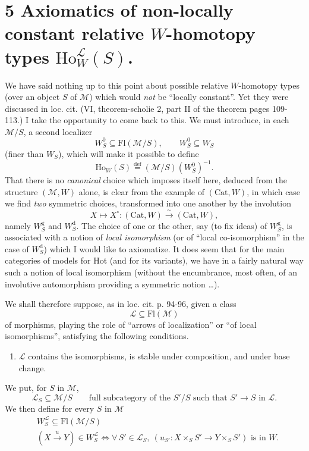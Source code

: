 \documentclass[11pt]{article}
\newcommand{\printedpage}[1]{\marginpar{\footnotesize p.~#1}}
\newcommand{\msp}[1]{\marginpar{\footnotesize [#1]}}
\newcommand{\deff}{\overset{\text{def}}{=}}
\begin{document}
\printedpage{140}

\section*{5 Axiomatics of non-locally constant relative $W$-homotopy types $\mathrm{Ho}^{\mathcal{L}}_W(S)$.}

We have said nothing up to this point about possible relative $W$-homotopy types (over an object $S$ of $\mathcal{M}$) which would \textit{not} be ``locally constant''. Yet they were discussed in loc. cit. (VI, theorem-scholie 2, part II of the theorem pages 109-113.) I take the opportunity to come back to this. We must introduce, in each $\mathcal{M}/S$, a second localizer
\[
W^0_S \subseteq \mathrm{Fl}(\mathcal{M}/S), \qquad W^0_S \subseteq W_S
\]
(finer than $W_S$), which will make it possible to define
\msp{page 219}
\[
\mathrm{Ho}_W(S) \deff (\mathcal{M}/S)(W^0_S)^{-1}.
\]
That there is no \textit{canonical} choice which imposes itself here, deduced from the structure $(\mathcal{M},W)$ alone, is clear from the example of $(\mathrm{Cat},W)$, in which case we find \textit{two} symmetric choices, transformed into one another by the involution
\[
X \longmapsto X^\circ : (\mathrm{Cat},W) \xrightarrow{\sim} (\mathrm{Cat},W),
\]
namely $W^{\mathrm{g}}_S$ and $W^{\mathrm{d}}_S$. The choice of one or the other, say (to fix ideas) of $W^{\mathrm{g}}_S$, is associated with a notion of \textit{local isomorphism} (or of ``local co-isomorphism'' in the case of $W^{\mathrm{d}}_S$) which I would like to axiomatize. It does seem that for the main categories of models for Hot (and for its variants), we have in a fairly natural way such a notion of local isomorphism (without the encumbrance, most often, of an involutive automorphism providing a symmetric notion \dots).

We shall therefore suppose, as in loc. cit. p. 94-96, given a class
\[
\mathcal{L} \subseteq \mathrm{Fl}(\mathcal{M})
\]
of morphisms, playing the role of ``arrows of %
\msp{page 220}
localization'' or ``of local isomorphisms'', satisfying the following conditions.

\begin{enumerate}
\item[$(*)$] $\mathcal{L}$ contains the isomorphisms, is stable under composition, and under base change.
\end{enumerate}

We put, for $S$ in $\mathcal{M}$,
\[
\mathcal{L}_S \subseteq \mathcal{M}/S \qquad \text{full subcategory of the } S'/S \text{ such that } S' \longrightarrow S \text{ in } \mathcal{L}.
\]
We then define for every $S$ in $\mathcal{M}$
\[
\begin{aligned}
&W^{\mathcal{L}}_S \subseteq \mathrm{Fl}(\mathcal{M}/S)\\
&(X \xrightarrow{u} Y) \in W^{\mathcal{L}}_S \iff \forall\, S' \in \mathcal{L}_S,\ (u_{S'} : X \times_S S' \longrightarrow Y \times_S S') \text{ is in } W.
\end{aligned}
\]
\end{document}
